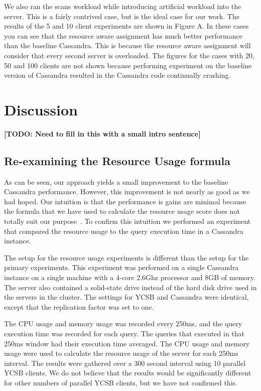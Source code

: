 \documentclass[]{acm_proc_article-sp}
\newcommand{\todo}[1]{\textbf{[TODO: #1]}}
\begin{document}
We also ran the scans workload while introducing artificial workload into the server. This is a fairly contrived case, but is the ideal case for our work. The results of the 5 and 10 client experiments are shown in Figure A. In these cases you can see that the resource aware assignment has much better performance than the baseline Cassandra. This is because the resource aware assignment will consider that every second server is overloaded. The figures for the cases with 20, 50 and 100 clients are not shown because performing experiment on the baseline version of Cassandra resulted in the Cassandra code continually crashing.

\section{Discussion}
\todo{Need to fill in this with a small intro sentence}

\subsection{Re-examining the Resource Usage formula}
As can be seen, our approach yields a small improvement to the baseline Cassandra performance. However, this improvement is not nearly as good as we had hoped. Our intuition is that the performance is gains are minimal because the formula that we have used to calculate the resource usage score does not totally suit our purpose~\cite{Gray and Black Box}. To confirm this intuition we performed an experiment that compared the resource usage to the query execution time in a Cassandra instance. 

The setup for the resource usage experiments is different than the setup for the primary experiments. This experiment was performed on a single Cassandra instance on a single machine with a 4-core 2.6Ghz processor and 8GB of memory. The server also contained a solid-state drive instead of the hard disk drive used in the servers in the cluster. The settings for YCSB and Cassandra were identical, except that the replication factor was set to one.

The CPU usage and memory usage was recorded every 250ms, and the query execution time was recorded for each query. The queries that executed in that 250ms window had their execution time averaged. The CPU usage and memory usage were used to calculate the resource usage of the server for each 250ms interval. The results were gathered over a 300 second interval using 10 parallel YCSB clients. We do not believe that the results would be significantly different for other numbers of parallel YCSB clients, but we have not confirmed this.
\end{document}
